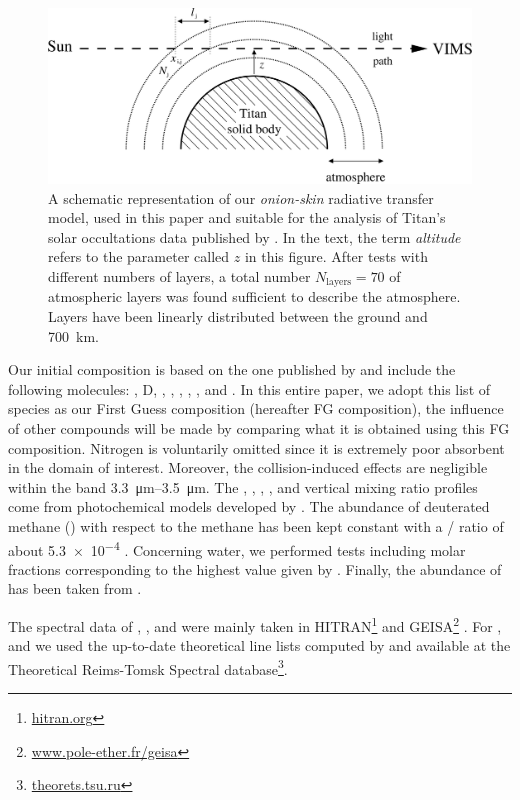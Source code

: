 \documentclass{arxiv-icarus}
\begin{document}
\begin{figure}[!ht]
    \includegraphics[width=\linewidth]{Fig_3}
    \caption{A schematic representation of our \emph{onion-skin} radiative transfer model, used in this paper and suitable for the
    analysis of Titan's solar occultations data published by \cite{Maltagliati2015}. In the text, the term \emph{altitude}
    refers to the parameter called $z$ in this figure. After tests with different numbers of layers, a total number $N_\text{layers}= 70$ of atmospheric layers was found sufficient to describe the atmosphere. Layers have been linearly distributed between the ground and \SI{700}{km}.}
    \label{fig:onion}
\end{figure}


Our initial composition is based on the one published by \cite{Maltagliati2015} and include the following molecules: , D, , , , , ,  and .
In this entire paper, we adopt this list of species as our First Guess composition (hereafter FG composition), the influence of other compounds will be made by comparing what it is obtained using this FG composition.
Nitrogen is voluntarily omitted since it is extremely poor absorbent in the domain of interest. Moreover, the collision-induced effects are negligible within the band \SIrange{3.3}{3.5}{\um}.
The , , , ,  and  vertical mixing ratio profiles come from photochemical models developed by \cite{Krasnopolsky2014}. The abundance of deuterated methane () with respect to the methane has been kept constant with a / ratio of about \num{5.3e-4} \citep{Bezard2007}.
Concerning water, we performed tests including molar fractions corresponding to the highest value given by \cite{Coustenis1998}. Finally, the abundance of  has been taken from \cite{Flasar2005}.

The spectral data of , ,  and  were mainly taken in HITRAN\footnote{\href{http://hitran.org/}{hitran.org}} \citep{Rothman2013} and GEISA\footnote{\href{http://www.pole-ether.fr/geisa/}{www.pole-ether.fr/geisa}} \citep{Jacquinet-Husson2008}.
For ,  and  we used the up-to-date theoretical line lists computed by \cite{Rey2016} and available at the Theoretical Reims-Tomsk Spectral database\footnote{\href{http://theorets.tsu.ru}{theorets.tsu.ru}}.
\end{document}
